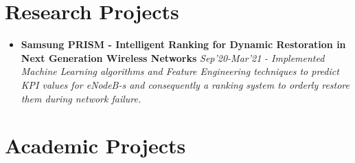 \documentclass{article}
\begin{document}
\section*{Research Projects}
\begin{itemize}
    \item{\textbf{\large{Samsung PRISM - Intelligent Ranking for Dynamic Restoration in Next Generation Wireless Networks}}} \hfill \textit{Sep'20-Mar'21}
          \newline
          \textit{- Implemented Machine Learning algorithms and Feature Engineering techniques to predict KPI values for eNodeB-s and consequently a ranking system
              to orderly restore them during network failure.}
\end{itemize}

\section*{Academic Projects}
\end{document}
